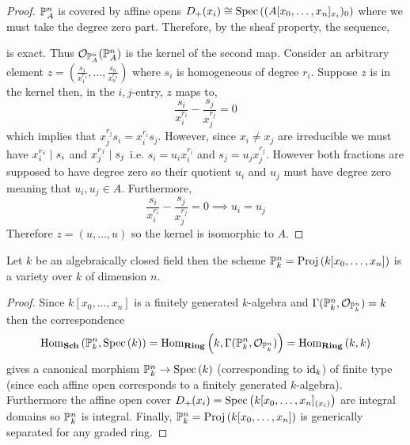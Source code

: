 \documentclass[12pt]{article}
\begin{document}
\begin{proof}
$\P^n_A$ is covered by affine opens $D_+(x_i) \cong \Spec{(A[x_0, \dots, x_n]_{x_i})_0}$ where we must take the degree zero part. Therefore, by the sheaf property, the sequence,
\begin{center}
\end{center}
is exact. Thus $\struct{\P^n_A}{(\P^n_A)}$ is the kernel of the second map. Consider an arbitrary element $z = \left( \frac{s_1}{x_1^{r_1}}, \dots, \frac{s_n}{x_n^{r_n}} \right)$ where $s_i$ is homogeneous of degree $r_i$. Suppose $z$ is in the kernel then, in the $i,j$-entry, $z$ maps to, 
\[ \frac{s_i}{x_i^{r_i}} - \frac{s_j}{x_j^{r_j}} = 0 \]
which implies that $x_j^{r_j} s_i = x_i^{r_i} s_j$. However, since $x_i \neq x_j$ are irreducible we must have $x_i^{r_i} \divides s_i$ and $x_j^{r_j} \divides s_j$ i.e. $s_i = u_i x_i^{r_i}$ and $s_j = u_j x_j^{r_j}$. However both fractions are supposed to have degree zero so their quotient $u_i$ and $u_j$ must have degree zero meaning that $u_i, u_j \in A$. Furthermore, 
\[ \frac{s_i}{x_i^{r_i}} - \frac{s_j}{x_j^{r_j}} = 0 \implies u_i = u_j \]
Therefore $z = (u, \dots, u)$ so the kernel is isomorphic to $A$. 
\end{proof}

\begin{lemma} \label{projective_space_is_variety}
Let $k$ be an algebraically closed field then
the scheme $\P^n_k = \Proj{k[x_0, \dots, x_n]}$ is a variety over $k$ of dimension $n$.
\end{lemma}

\begin{proof}
Since $k[x_0, \dots, x_n]$ is a finitely generated $k$-algebra and $\Gamma(\P^n_k, \struct{\P^n_k}) = k$ then the correspondence
\[ \Homover{\Sch}{\P^n_k}{\Spec{k}} = \Homover{\Ring}{k}{\Gamma(\mathbb{P}^n_k, \struct{\P^n_k})} = \Homover{\Ring}{k}{k} \]
gives a canonical morphism $\P^n_k \to \Spec{k}$ (corresponding to $\id_k$) of finite type (since each affine open corresponds to a finitely generated $k$-algebra). Furthermore the affine open cover $D_+(x_i) = \Spec{k[x_0, \dots, x_n]_{(x_i)}}$ are integral domains so $\P^n_k$ is integral. Finally, $\P^n_k = \Proj{k[x_0, \dots, x_n]}$ is generically separated for any graded ring.  
\end{proof}
\end{document}
